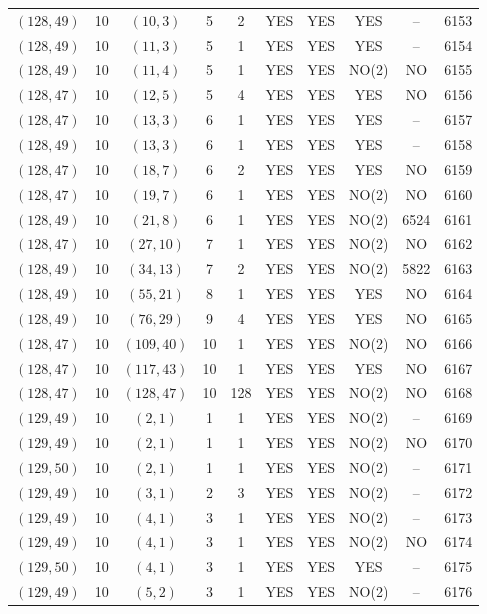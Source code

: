 \begin{longtable}{|c|c|c|c|c|c|c|c|c|c|}
$(128, 49)$ & 10 & $(10, 3)$ & 5 & 2 & YES & YES & YES & -- & 6153\\
$(128, 49)$ & 10 & $(11, 3)$ & 5 & 1 & YES & YES & YES & -- & 6154\\
$(128, 49)$ & 10 & $(11, 4)$ & 5 & 1 & YES & YES & NO(2) & NO & 6155\\
$(128, 47)$ & 10 & $(12, 5)$ & 5 & 4 & YES & YES & YES & NO & 6156\\
$(128, 47)$ & 10 & $(13, 3)$ & 6 & 1 & YES & YES & YES & -- & 6157\\
$(128, 49)$ & 10 & $(13, 3)$ & 6 & 1 & YES & YES & YES & -- & 6158\\
$(128, 47)$ & 10 & $(18, 7)$ & 6 & 2 & YES & YES & YES & NO & 6159\\
$(128, 47)$ & 10 & $(19, 7)$ & 6 & 1 & YES & YES & NO(2) & NO & 6160\\
$(128, 49)$ & 10 & $(21, 8)$ & 6 & 1 & YES & YES & NO(2) & 6524 & 6161\\
$(128, 47)$ & 10 & $(27, 10)$ & 7 & 1 & YES & YES & NO(2) & NO & 6162\\
$(128, 49)$ & 10 & $(34, 13)$ & 7 & 2 & YES & YES & NO(2) & 5822 & 6163\\
$(128, 49)$ & 10 & $(55, 21)$ & 8 & 1 & YES & YES & YES & NO & 6164\\
$(128, 49)$ & 10 & $(76, 29)$ & 9 & 4 & YES & YES & YES & NO & 6165\\
$(128, 47)$ & 10 & $(109, 40)$ & 10 & 1 & YES & YES & NO(2) & NO & 6166\\
$(128, 47)$ & 10 & $(117, 43)$ & 10 & 1 & YES & YES & YES & NO & 6167\\
$(128, 47)$ & 10 & $(128, 47)$ & 10 & 128 & YES & YES & NO(2) & NO & 6168\\
$(129, 49)$ & 10 & $(2, 1)$ & 1 & 1 & YES & YES & NO(2) & -- & 6169\\
$(129, 49)$ & 10 & $(2, 1)$ & 1 & 1 & YES & YES & NO(2) & NO & 6170\\
$(129, 50)$ & 10 & $(2, 1)$ & 1 & 1 & YES & YES & NO(2) & -- & 6171\\
$(129, 49)$ & 10 & $(3, 1)$ & 2 & 3 & YES & YES & NO(2) & -- & 6172\\
$(129, 49)$ & 10 & $(4, 1)$ & 3 & 1 & YES & YES & NO(2) & -- & 6173\\
$(129, 49)$ & 10 & $(4, 1)$ & 3 & 1 & YES & YES & NO(2) & NO & 6174\\
$(129, 50)$ & 10 & $(4, 1)$ & 3 & 1 & YES & YES & YES & -- & 6175\\
$(129, 49)$ & 10 & $(5, 2)$ & 3 & 1 & YES & YES & NO(2) & -- & 6176\\

\end{longtable}
